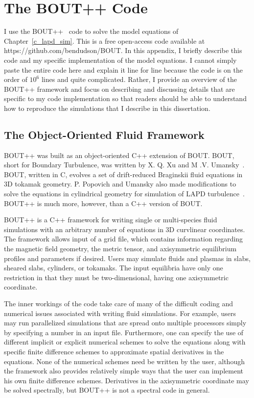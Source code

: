 \chapter{The BOUT++ Code}
\label{app_bout}

I use the BOUT++~\cite{dudson2009} code to solve the model equations of Chapter~\ref{c_lapd_sim}. This is a free open-access code available at https://github.com/bendudson/BOUT.
In this appendix, I briefly describe this code and my specific implementation of the model equations.
I cannot simply paste the entire code here and explain it line for line because the code is on the order of $10^6$ lines and quite complicated. Rather, I provide an overview of the BOUT++ framework
and focus on describing and discussing details that are specific to my code implementation so that readers should be able to understand how to reproduce the simulations that I describe in this
dissertation.

\section{The Object-Oriented Fluid Framework}
\label{s_obj_oriented}

BOUT++ was built as an object-oriented C++ extension of BOUT. BOUT, short for Boundary Turbulence, was written by X. Q. Xu and M .V. Umansky~\cite{xu1998,umansky2009}. BOUT, written in C, evolves
a set of drift-reduced Braginskii fluid equations in 3D tokamak geometry. P. Popovich and Umansky also made modifications to solve the equations in cylindrical geometry for simulation of
LAPD turbulence~\cite{popovich2010b}. BOUT++ is much more, however, than a C++ version of BOUT.

BOUT++ is a C++ framework for writing single or multi-species fluid simulations with an arbitrary number of equations in 3D curvlinear coordinates. The framework allows input of a grid file,
which contains information regarding the magnetic field geometry, the metric tensor, and axisymmetric equilibrium profiles and parameters if desired. Users may simulate fluids and plasmas
in slabs, sheared slabs, cylinders, or tokamaks. The input equilibria have only one restriction in that they must be two-dimensional, having one axisymmetric coordinate.

The inner workings of the code take care of many of the difficult coding and numerical issues associated with writing
fluid simulations. For example, users may run parallelized simulations that are spread onto multiple processors simply by specifying a number in an input file. Furthermore, one can specify the use
of different implicit or explicit numerical schemes to solve the equations along with specific finite difference schemes to approximate spatial derivatives in the equations. 
None of the numerical schemes need be written by the user, although the framework also provides relatively simple ways that the user can implement his own finite difference schemes. 
Derivatives in the axisymmetric coordinate may be solved spectrally, but BOUT++ is not a spectral code in general.

